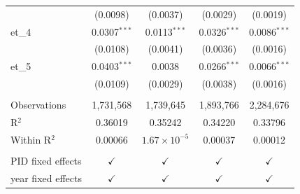 \begin{tabular}{lcccc}
                      & (0.0098)                               & (0.0037)                              & (0.0029)                          & (0.0019)\\   
   et\_4              & 0.0307$^{***}$                         & 0.0113$^{***}$                        & 0.0326$^{***}$                    & 0.0086$^{***}$\\   
                      & (0.0108)                               & (0.0041)                              & (0.0036)                          & (0.0016)\\   
   et\_5              & 0.0403$^{***}$                         & 0.0038                                & 0.0266$^{***}$                    & 0.0066$^{***}$\\   
                      & (0.0109)                               & (0.0029)                              & (0.0038)                          & (0.0016)\\   
    \\
   Observations       & 1,731,568                              & 1,739,645                             & 1,893,766                         & 2,284,676\\  
   R$^2$              & 0.36019                                & 0.35242                               & 0.34220                           & 0.33796\\  
   Within R$^2$       & 0.00066                                & $1.67\times 10^{-5}$                  & 0.00037                           & 0.00012\\  
    \\
   PID fixed effects  & $\checkmark$                           & $\checkmark$                          & $\checkmark$                      & $\checkmark$\\   
   year fixed effects & $\checkmark$                           & $\checkmark$                          & $\checkmark$                      & $\checkmark$\\   
   \bottomrule
\end{tabular}
\par\endgroup


